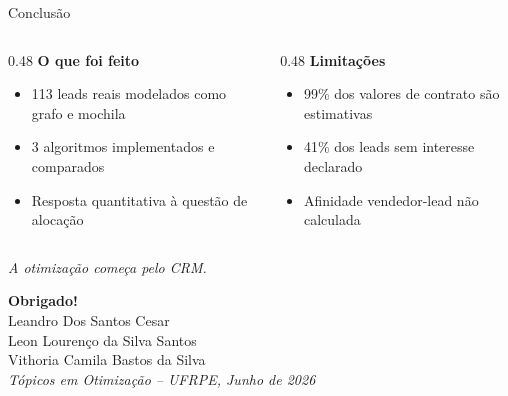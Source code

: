 \documentclass[aspectratio=169,11pt]{beamer}
\begin{document}
\begin{frame}{Conclus\~{a}o}
\begin{columns}[T]

\begin{column}{0.48\textwidth}
  \textbf{O que foi feito}
  \vspace{0.3em}
  \begin{itemize}\setlength\itemsep{4pt}
    \item 113 leads reais modelados como grafo e mochila
    \item 3 algoritmos implementados e comparados
    \item Resposta quantitativa \`{a} quest\~{a}o de aloca\c{c}\~{a}o
  \end{itemize}
\end{column}

\begin{column}{0.48\textwidth}
  \textbf{Limita\c{c}\~{o}es}
  \vspace{0.3em}
  \begin{itemize}\setlength\itemsep{4pt}
    \item 99\% dos valores de contrato s\~{a}o estimativas
    \item 41\% dos leads sem interesse declarado
    \item Afinidade vendedor-lead n\~{a}o calculada
  \end{itemize}
\end{column}

\end{columns}

\vspace{1.2em}
\begin{center}
  \large\textit{A otimiza\c{c}\~{a}o come\c{c}a pelo CRM.}
\end{center}
\end{frame}

\begin{frame}[plain]
  \vspace{2.5em}
  \begin{center}
    {\LARGE\bfseries Obrigado!}\\[1.4em]
    Leandro Dos Santos Cesar\\
    Leon Louren\c{c}o da Silva Santos\\
    Vithoria Camila Bastos da Silva\\[1.4em]
    \textit{T\'{o}picos em Otimiza\c{c}\~{a}o -- UFRPE, Junho de 2026}
  \end{center}
\end{frame}
\end{document}
